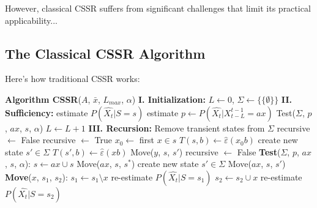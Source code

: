 \documentclass[11pt]{article}
\begin{document}
However, classical CSSR suffers from significant challenges that limit its practical applicability...

\subsection{The Classical CSSR Algorithm}

Here's how traditional CSSR works:

\begin{codebox}
\begin{algorithmic}
\STATE \textbf{Algorithm CSSR}($A$, $\bar{x}$, $L_{max}$, $\alpha$)
\STATE
\STATE \textbf{I. Initialization:} $L \leftarrow 0$, $\Sigma \leftarrow \{\{\emptyset\}\}$
\STATE
\STATE \textbf{II. Sufficiency:}
        \STATE estimate $P(\widehat{X_t}|S = s)$
                \STATE estimate $p \leftarrow P(\widehat{X_t}|X_{t-L}^{t-1} = ax)$
                \STATE Test($\Sigma$, $p$, $ax$, $s$, $\alpha$)
            \ENDFOR
        \ENDFOR
    \ENDFOR
    \STATE $L \leftarrow L + 1$
\ENDWHILE
\STATE
\STATE \textbf{III. Recursion:}
\STATE Remove transient states from $\Sigma$
\STATE recursive $\leftarrow$ False
\REPEAT
    \STATE recursive $\leftarrow$ True
            \STATE $x_0 \leftarrow$ first $x \in s$
            \STATE $T(s, b) \leftarrow \hat{\varepsilon}(x_0 b)$
                    \STATE create new state $s' \in \Sigma$
                    \STATE $T(s', b) \leftarrow \hat{\varepsilon}(xb)$
                        \STATE Move($y$, $s$, $s'$)
                    \ENDFOR
                    \STATE recursive $\leftarrow$ False
                \ENDIF
            \ENDFOR
        \ENDFOR
    \ENDFOR
{}
\STATE
\STATE \textbf{Test}($\Sigma$, $p$, $ax$, $s$, $\alpha$):
    \STATE $s \leftarrow ax \cup s$
    \STATE Move($ax$, $s$, $s^*$)
\ELSE
    \STATE create new state $s' \in \Sigma$
    \STATE Move($ax$, $s$, $s'$)
\ENDIF
\STATE
\STATE \textbf{Move}($x$, $s_1$, $s_2$):
\STATE $s_1 \leftarrow s_1 \setminus x$
\STATE re-estimate $P(\widehat{X_t}|S = s_1)$
\STATE $s_2 \leftarrow s_2 \cup x$
\STATE re-estimate $P(\widehat{X_t}|S = s_2)$
\end{algorithmic}
\end{codebox}
\end{document}
